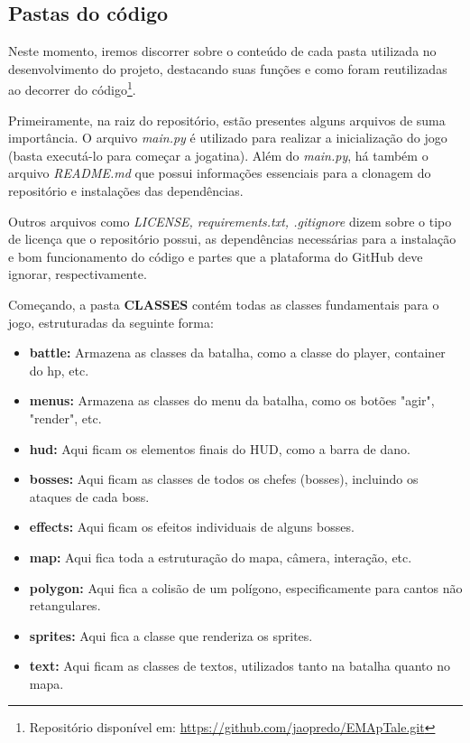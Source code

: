 \documentclass[a4paper, 12pt, twoside]{article}
\begin{document}
\subsection{Pastas do código}
Neste momento, iremos discorrer sobre o conteúdo de cada pasta utilizada no desenvolvimento do projeto, destacando suas funções e como foram reutilizadas ao decorrer do código\footnote{Repositório disponível em: \url{https://github.com/jaopredo/EMApTale.git}}.

Primeiramente, na raiz do repositório, estão presentes alguns arquivos de suma importância. O arquivo \textit{main.py} é utilizado para realizar a inicialização do jogo (basta executá-lo para começar a jogatina). Além do \textit{main.py}, há também o arquivo \textit{README.md} que possui informações essenciais para a clonagem do repositório e instalações das dependências.

Outros arquivos como \textit{LICENSE, requirements.txt, .gitignore} dizem sobre o tipo de licença que o repositório possui, as dependências necessárias para a instalação e bom funcionamento do código e partes que a plataforma do GitHub deve ignorar, respectivamente.

Começando, a pasta \textbf{CLASSES} contém todas as classes fundamentais para o jogo, estruturadas da seguinte forma:

\begin{itemize}[nosep]
    \item \textbf{battle:} Armazena as classes da batalha, como a classe do player, container do hp, etc.
    \item \textbf{menus:} Armazena as classes do menu da batalha, como os botões "agir", "render", etc.
    \item \textbf{hud:} Aqui ficam os elementos finais do HUD, como a barra de dano.
    \item \textbf{bosses:} Aqui ficam as classes de todos os chefes (bosses), incluindo os ataques de cada boss.
    \item \textbf{effects:} Aqui ficam os efeitos individuais de alguns bosses.
    \item \textbf{map:} Aqui fica toda a estruturação do mapa, câmera, interação, etc.
    \item \textbf{polygon:} Aqui fica a colisão de um polígono, especificamente para cantos não retangulares.
    \item \textbf{sprites:} Aqui fica a classe que renderiza os sprites.
    \item \textbf{text:} Aqui ficam as classes de textos, utilizados tanto na batalha quanto no mapa.
\end{itemize}
\end{document}
